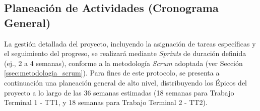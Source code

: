 \documentclass[12pt]{article}
\begin{document}
\subsection{Planeación de Actividades (Cronograma General)}
\label{ssec:planeacion_actividades_listas}

La gestión detallada del proyecto, incluyendo la asignación de tareas específicas y el seguimiento del progreso, se realizará mediante \textit{Sprints} de duración definida (ej., 2 a 4 semanas), conforme a la metodología \textit{Scrum} adoptada (ver Sección \ref{ssec:metodologia_scrum}). Para fines de este protocolo, se presenta a continuación una planeación general de alto nivel, distribuyendo los Épicos del proyecto a lo largo de las 36 semanas estimadas (18 semanas para Trabajo Terminal 1 - TT1, y 18 semanas para Trabajo Terminal 2 - TT2).
\end{document}
